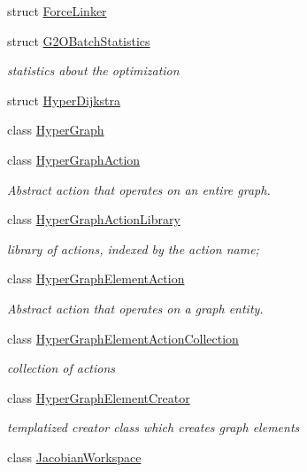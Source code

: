 \begin{DoxyCompactItemize}
struct \mbox{\hyperlink{structg2o_1_1_force_linker}{Force\+Linker}}
\item 
struct \mbox{\hyperlink{structg2o_1_1_g2_o_batch_statistics}{G2\+O\+Batch\+Statistics}}
\begin{DoxyCompactList}\small\item\em statistics about the optimization \end{DoxyCompactList}\item 
struct \mbox{\hyperlink{structg2o_1_1_hyper_dijkstra}{Hyper\+Dijkstra}}
\item 
class \mbox{\hyperlink{classg2o_1_1_hyper_graph}{Hyper\+Graph}}
\item 
class \mbox{\hyperlink{classg2o_1_1_hyper_graph_action}{Hyper\+Graph\+Action}}
\begin{DoxyCompactList}\small\item\em Abstract action that operates on an entire graph. \end{DoxyCompactList}\item 
class \mbox{\hyperlink{classg2o_1_1_hyper_graph_action_library}{Hyper\+Graph\+Action\+Library}}
\begin{DoxyCompactList}\small\item\em library of actions, indexed by the action name; \end{DoxyCompactList}\item 
class \mbox{\hyperlink{classg2o_1_1_hyper_graph_element_action}{Hyper\+Graph\+Element\+Action}}
\begin{DoxyCompactList}\small\item\em Abstract action that operates on a graph entity. \end{DoxyCompactList}\item 
class \mbox{\hyperlink{classg2o_1_1_hyper_graph_element_action_collection}{Hyper\+Graph\+Element\+Action\+Collection}}
\begin{DoxyCompactList}\small\item\em collection of actions \end{DoxyCompactList}\item 
class \mbox{\hyperlink{classg2o_1_1_hyper_graph_element_creator}{Hyper\+Graph\+Element\+Creator}}
\begin{DoxyCompactList}\small\item\em templatized creator class which creates graph elements \end{DoxyCompactList}\item 
class \mbox{\hyperlink{classg2o_1_1_jacobian_workspace}{Jacobian\+Workspace}}

\end{DoxyCompactItemize}

